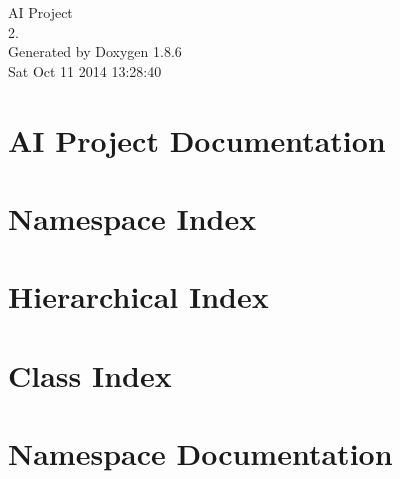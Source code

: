 \documentclass[twoside]{book}
\newcommand{\clearemptydoublepage}{%
  \newpage{\pagestyle{empty}\cleardoublepage}%
}
\begin{document}
\hypersetup{pageanchor=false}
\begin{titlepage}
\vspace*{7cm}
\begin{center}%
{\Large A\-I Project \\[1ex]\large 2. }\\
\vspace*{1cm}
{\large Generated by Doxygen 1.8.6}\\
\vspace*{0.5cm}
{\small Sat Oct 11 2014 13:28:40}\\
\end{center}
\end{titlepage}
\clearemptydoublepage
\tableofcontents
\clearemptydoublepage
{}
\hypersetup{pageanchor=true}

\chapter{A\-I Project Documentation}
\label{index}\hypertarget{index}{}
\chapter{Namespace Index}

\chapter{Hierarchical Index}

\chapter{Class Index}

\chapter{Namespace Documentation}

\end{document}
